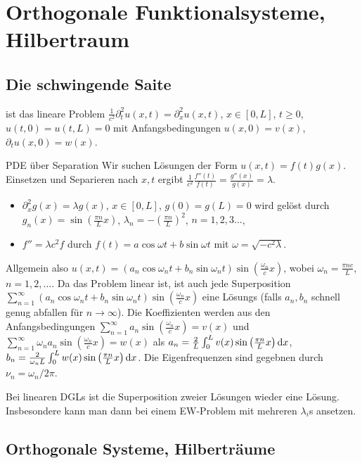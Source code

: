\chapter{Orthogonale Funktionalsysteme, Hilbertraum}

\section{Die schwingende Saite}

ist das lineare Problem $\frac1{c^2}\partial_t^2u(x,t)=\partial^2_xu(x,t)$, $x\in[0,L]$, $t\geq0$, $u(t,0)=u(t,L)=0$ mit Anfangsbedingungen $u(x,0)=v(x)$, $\partial_tu(x,0)=w(x)$.

\begin{namedtheorem}{PDE über Separation}
  Wir suchen Lösungen der Form $u(x,t)=f(t)g(x)$. Einsetzen und Separieren nach $x,t$ ergibt $\frac1{c^2}\frac{f''(t)}{f(t)}=\frac{g''(x)}{g(x)}=\lambda$.
  \begin{itemize}
    \item $\partial_x^2g(x)=\lambda g(x)$, $x\in[0,L]$, $g(0)=g(L)=0$ wird gelöst durch $g_n(x)=\sin\left(\frac{\pi n}{L}x\right)$, $\lambda_n=-\left(\frac{\pi n}L\right)^2$, $n=1,2,3\ldots$,
    \item $f''=\lambda c^2f$ durch $f(t)=a\cos\omega t + b\sin \omega t$ mit $\omega=\sqrt{-c^2\lambda}$.
  \end{itemize}
  Allgemein also $u(x,t)=(a_n\cos\omega_nt + b_n\sin\omega_nt)\sin\left(\frac{\omega_n}cx\right)$, wobei $\omega_n=\frac{\pi n c}L$, $n=1,2,\ldots$. Da das Problem linear ist, ist auch jede Superposition $\sum_{n=1}^{\infty}(a_n\cos\omega_nt + b_n\sin\omega_nt)\sin\left(\frac{\omega_n}cx\right)$ eine Lösungs (falls $a_n,b_n$ schnell genug abfallen für $n\rightarrow\infty$). Die Koeffizienten werden aus den Anfangsbedingungen $\sum_{n=1}^{\infty}a_n\sin\left(\frac{\omega_n}cx\right)=v(x)$ und $\sum_{n=1}^{\infty}\omega_n a_n\sin\left(\frac{\omega_n}cx\right)=w(x)$ als $a_n=\frac2L\int_0^L v(x)\sin\left(\frac{\pi n}{L}x\right)\mathrm{d}x$, $b_n=\frac2{\omega_nL}\int_0^L w(x)\sin\left(\frac{\pi n}{L}x\right)\mathrm{d}x$. Die Eigenfrequenzen sind gegebnen durch $\nu_n=\omega_n/2\pi$.

Bei linearen DGLs ist die Superposition zweier Lösungen wieder eine Lösung. Insbesondere kann man dann bei einem EW-Problem mit mehreren $\lambda_i$s ansetzen.
\end{namedtheorem}

\section{Orthogonale Systeme, Hilberträume}

